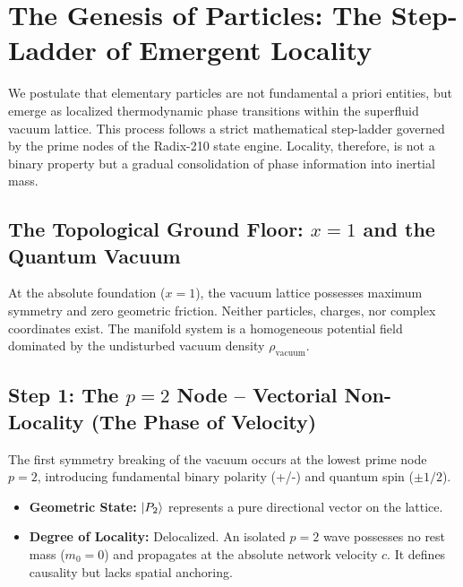 \documentclass[11pt,a4paper]{article}
\theoremstyle{plain}
\theoremstyle{definition}
\theoremstyle{remark}
\begin{document}
\newpage
\section{The Genesis of Particles: The Step-Ladder of Emergent Locality}
\label{sec:genesis_particles}

We postulate that elementary particles are not fundamental a priori entities, but emerge as localized thermodynamic phase transitions within the superfluid vacuum lattice. This process follows a strict mathematical step-ladder governed by the prime nodes of the Radix-210 state engine. Locality, therefore, is not a binary property but a gradual consolidation of phase information into inertial mass.

\subsection{The Topological Ground Floor: $x=1$ and the Quantum Vacuum}
At the absolute foundation ($x=1$), the vacuum lattice possesses maximum symmetry and zero geometric friction. Neither particles, charges, nor complex coordinates exist. The manifold system is a homogeneous potential field dominated by the undisturbed vacuum density $\rho_{\text{vacuum}}$.

\subsection{Step 1: The $p=2$ Node – Vectorial Non-Locality (The Phase of Velocity)}
The first symmetry breaking of the vacuum occurs at the lowest prime node $p=2$, introducing fundamental binary polarity (+/-) and quantum spin ($\pm 1/2$).
\begin{itemize}
    \item \textbf{Geometric State:} $\ket{P_2}$ represents a pure directional vector on the lattice.
    \item \textbf{Degree of Locality:} Delocalized. An isolated $p=2$ wave possesses no rest mass ($m_0 = 0$) and propagates at the absolute network velocity $c$. It defines causality but lacks spatial anchoring.
\end{itemize}
\end{document}

